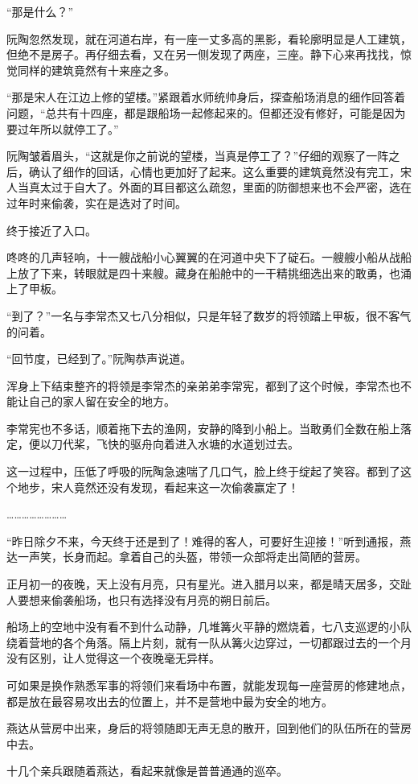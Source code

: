 “那是什么？”

阮陶忽然发现，就在河道右岸，有一座一丈多高的黑影，看轮廓明显是人工建筑，但绝不是房子。再仔细去看，又在另一侧发现了两座，三座。静下心来再找找，惊觉同样的建筑竟然有十来座之多。

“那是宋人在江边上修的望楼。”紧跟着水师统帅身后，探查船场消息的细作回答着问题，“总共有十四座，都是跟船场一起修起来的。但都还没有修好，可能是因为要过年所以就停工了。”

阮陶皱着眉头，“这就是你之前说的望楼，当真是停工了？”仔细的观察了一阵之后，确认了细作的回话，心情也更加好了起来。这么重要的建筑竟然没有完工，宋人当真太过于自大了。外面的耳目都这么疏忽，里面的防御想来也不会严密，选在过年时来偷袭，实在是选对了时间。

终于接近了入口。

咚咚的几声轻响，十一艘战船小心翼翼的在河道中央下了碇石。一艘艘小船从战船上放了下来，转眼就是四十来艘。藏身在船舱中的一干精挑细选出来的敢勇，也涌上了甲板。

“到了？”一名与李常杰又七八分相似，只是年轻了数岁的将领踏上甲板，很不客气的问着。

“回节度，已经到了。”阮陶恭声说道。

浑身上下结束整齐的将领是李常杰的亲弟弟李常宪，都到了这个时候，李常杰也不能让自己的家人留在安全的地方。

李常宪也不多话，顺着拖下去的渔网，安静的降到小船上。当敢勇们全数在船上落定，便以刀代桨，飞快的驱舟向着进入水塘的水道划过去。

这一过程中，压低了呼吸的阮陶急速喘了几口气，脸上终于绽起了笑容。都到了这个地步，宋人竟然还没有发现，看起来这一次偷袭赢定了！

……………………

“昨日除夕不来，今天终于还是到了！难得的客人，可要好生迎接！”听到通报，燕达一声笑，长身而起。拿着自己的头盔，带领一众部将走出简陋的营房。

正月初一的夜晚，天上没有月亮，只有星光。进入腊月以来，都是晴天居多，交趾人要想来偷袭船场，也只有选择没有月亮的朔日前后。

船场上的空地中没有看不到什么动静，几堆篝火平静的燃烧着，七八支巡逻的小队绕着营地的各个角落。隔上片刻，就有一队从篝火边穿过，一切都跟过去的一个月没有区别，让人觉得这一个夜晚毫无异样。

可如果是换作熟悉军事的将领们来看场中布置，就能发现每一座营房的修建地点，都是放在最容易攻出去的位置上，并不是营地中最为安全的地方。

燕达从营房中出来，身后的将领随即无声无息的散开，回到他们的队伍所在的营房中去。

十几个亲兵跟随着燕达，看起来就像是普普通通的巡卒。

